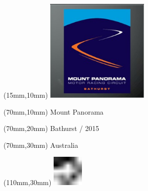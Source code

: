 \null\newpage
\begin{textblock*}{50mm}(15mm,10mm)%
\includegraphics[width=50mm]{LG/2015-05-20_00087.png}
\end{textblock*}
\begin{textblock*}{130mm}(70mm,10mm)%
{\fontsize{20}{20}\selectfont Mount Panorama}\\
\end{textblock*}
\begin{textblock*}{120mm}(70mm,20mm)%
{\fontsize{16}{16}\selectfont Bathurst / 2015}\\
\end{textblock*}
\begin{textblock*}{120mm}(70mm,30mm)%
{\fontsize{12}{12}\selectfont Australia}
\end{textblock*}
\begin{textblock*}{30mm}(110mm,30mm)%
\centering
\includegraphics[height=15mm]{icons/fa-rotate-left.pdf}
\end{textblock*}
